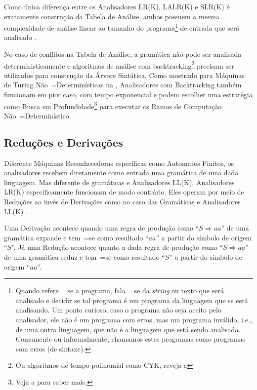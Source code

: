 {    Como única diferença entre os Analisadores LR(K),
    LALR(K) e
    SLR(K) é exatamente construção da Tabela de Análise,
    ambos possuem a mesma complexidade de análise linear ao tamanho do programa\footnote{
    Quando refere~=se a programa,
    fala~=se da \textit{string} ou
    texto que será analisado e
    decidir se tal programa é um programa da linguagem que se está analisando.
    Um ponto curioso,
    caso o programa não seja aceito pelo analisador,
    ele não é um programa com erros,
    mas um programa inválido,
    i.e.,
    de uma outra linguagem,
    que não é a linguagem que está sendo analisada.
    Comumente ou
    informalmente,
    chamamos estes programas como programas com erros (de sintaxe).
    }
    de entrada que será analisado \cite{knuthLrParser1965,linearLL1AndLR1Grammars,generalContextFreeParsingAlgorithm}.

    No caso de conflitos na Tabela de Análise,
    a gramática não pode ser analisada deterministicamente e
    algoritmos de análise com backtracking\footnote{
    Ou algoritmos de tempo polinomial como CYK,
    reveja a 
    }
    precisam ser utilizados para construção da Árvore Sintática.
    Como mostrado para Máquinas de Turing Não~=Determinísticas na ,
    Analisadores com Backtracking também funcionam em pior caso,
    com tempo exponencial e
    podem escolher uma estratégia como Busca em Profundidade\footnote{
    Veja a  para saber mais.
    } para executar os Ramos de Computação Não~=Determinístico.


\subsection{Reduções e Derivações}
\label{reducoesEderivacoes}

    Diferente Máquinas Reconhecedoras específicas como Automatos Finitos,
    os analisadores recebem diretamente como entrada uma gramática de uma dada linguagem.
    Mas diferente de gramáticas e
    Analisadores LL(K),
    Analisadores LR(K) especificamente funcionam de modo contrário.
    Eles operam por meio de Reduções ao invés de Derivações como no caso das Gramáticas e
    Analisadores LL(K) \cite{ahoCompilerDragonBook}.

    Uma Derivação acontece quando uma regra de produção como ``$S \Rightarrow a a $'' de uma gramática expande e
    tem~=se como resultado ``$a a$'' a partir do símbolo de origem ``$S$''.
    Já uma Redução acontece quanto a dada regra de produção como ``$S \Rightarrow a a $'' de uma gramática reduz e
    tem~=se como resultado ``$S$'' a partir do símbolo de origem ``$a a$''.

}
